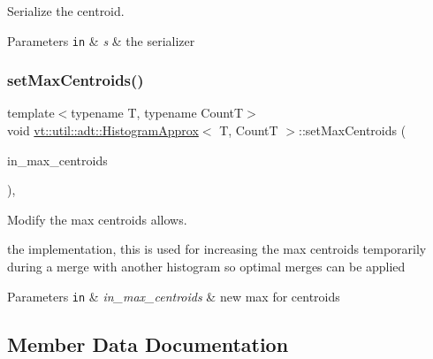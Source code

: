 Serialize the centroid. 


\begin{DoxyParams}[1]{Parameters}
\mbox{\tt in}  & {\em s} & the serializer \\
\hline
\end{DoxyParams}
\mbox{\label{structvt_1_1util_1_1adt_1_1_histogram_approx_aa23f54efa5c883d2759ceacd3f32279a}} 
\subsubsection{\texorpdfstring{set\+Max\+Centroids()}{setMaxCentroids()}}
{\footnotesize\ttfamily template$<$typename T, typename CountT$>$ \\
void \hyperlink{structvt_1_1util_1_1adt_1_1_histogram_approx}{vt\+::util\+::adt\+::\+Histogram\+Approx}$<$ T, CountT $>$\+::set\+Max\+Centroids (\begin{DoxyParamCaption}\item[{\hyperlink{structvt_1_1util_1_1adt_1_1_histogram_approx_aa2fb74665588d311da76dd821f2912c6}{Count\+Type}}]{in\+\_\+max\+\_\+centroids }\end{DoxyParamCaption})\hspace{0.3cm}{\ttfamily [inline]}, {\ttfamily [private]}}



Modify the max centroids allows. 

the implementation, this is used for increasing the max centroids temporarily during a merge with another histogram so optimal merges can be applied


\begin{DoxyParams}[1]{Parameters}
\mbox{\tt in}  & {\em in\+\_\+max\+\_\+centroids} & new max for centroids \\
\hline
\end{DoxyParams}


\subsection{Member Data Documentation}
\mbox{\label{structvt_1_1util_1_1adt_1_1_histogram_approx_a777a1384cff8b2bd7e0cd8b8a7c4def4}} 
